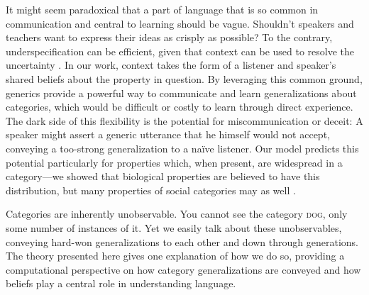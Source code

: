 \documentclass[12pt,letterpaper]{article}
\begin{document}
It might seem paradoxical that a part of language that is so common in communication and central to learning should be vague. 
Shouldn't speakers and teachers want to express their ideas as crisply as possible?
To the contrary, underspecification can be efficient, given that context can be used to resolve the uncertainty \cite{Piantadosi2012}.
In our work, context takes the form of a listener and speaker's shared beliefs about the property in question. 
By leveraging this common ground, generics provide a powerful way to communicate and learn generalizations about categories, 
which would be difficult or costly to learn through direct experience.
The dark side of this flexibility is the potential for miscommunication or deceit: A speaker might assert a generic utterance that he himself would not accept, conveying a too-strong generalization to a na\"{i}ve listener.  
Our model predicts this potential particularly for properties which, when present, are widespread in a category---we showed that biological properties are believed to have this distribution, but many properties of social categories may as well \cite{Cimpian2011a,Cimpian2012b,Rhodes2012}.


Categories are inherently unobservable. 
You cannot see the category \textsc{dog}, only some number of instances of it.
Yet we easily talk about these unobservables, conveying hard-won generalizations to each other and down through generations.
The theory presented here gives one explanation of how we do so, providing a computational perspective on how category generalizations are conveyed and how beliefs play a central role in understanding language.
\end{document}

